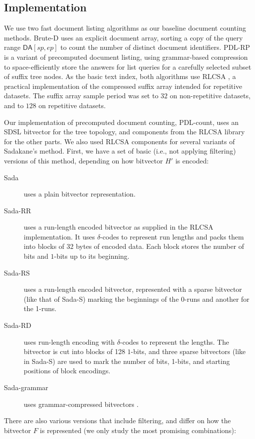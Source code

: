 \documentclass[11pt]{llncs}
\newcommand{\DA}{\ensuremath{\mathsf{DA}}}
\newcommand{\doclist}{\textsf{list}}
\newcommand{\BruteD}{\textsf{Brute-D}}
\newcommand{\PDLRP}{\textsf{PDL-RP}}
\newcommand{\PDLcount}{\textsf{PDL-count}} \newcommand{\SadaR}{\textsf{Sada-RR}} \newcommand{\SadaPG}{\textsf{Sada-P-G}} \newcommand{\SadaPR}{\textsf{Sada-P-RR}} \newcommand{\SadaRG}{\textsf{Sada-RR-G}} \newcommand{\SadaRR}{\textsf{Sada-RR-RR}} \newcommand{\SadaG}{\textsf{Sada-grammar}} \newcommand{\sada}{\textsf{Sada}} \newcommand{\sadaR}{\textsf{Sada-RS}} \newcommand{\sadaRS}{\textsf{Sada-RS-S}} \newcommand{\sadaD}{\textsf{Sada-RD}} \newcommand{\sadaDS}{\textsf{Sada-RD-S}} \newcommand{\sadaS}{\textsf{Sada-S-S}} \newcommand{\sadaSS}{\textsf{Sada-S}} \newcommand{\wt}{\textsf{ILCP}}
\newcommand{\onebit}{$1$\nobreakdash-bit}
\begin{document}
\subsection{Implementation}

We use two fast document listing algorithms as our baseline document counting methods. \BruteD{} uses an explicit document array, sorting a copy of the query range $\DA[sp,ep]$ to count the number of distinct document identifiers. \PDLRP{} \cite{NPS2014} is a variant of precomputed document listing, using grammar-based compression to space-efficiently store the answers for \doclist{} queries for a carefully selected subset of suffix tree nodes. As the basic text index, both algorithms use RLCSA \cite{Maekinen2010}, a practical implementation of the compressed suffix array intended for repetitive datasets. The suffix array sample period was set to $32$ on non-repetitive datasets, and to $128$ on repetitive datasets.

Our implementation of precomputed document counting, \PDLcount, uses an SDSL
\cite{Gog2014b} bitvector for the tree topology, and components from the RLCSA
library for the other parts. We also used RLCSA components for several
variants of Sadakane's method. First, we have a set of basic (i.e., not
applying filtering) versions of this method, depending on how bitvector $H'$
is encoded:
\begin{description}
\item[\sada] uses a plain bitvector representation.
\item[\SadaR] uses a run-length encoded bitvector as supplied in the RLCSA
implementation. It uses $\delta$-codes to represent run lengths and packs
them into blocks of 32 bytes of encoded data. Each block stores the number
of bits and \onebit{}s up to its beginning.
\item[\sadaR] uses a run-length encoded bitvector, represented with a sparse
bitvector (like that of \sadaSS) marking the beginnings of the 0-runs and
another for the 1-runs.
\item[\sadaD] uses run-length encoding with $\delta$-codes to represent the
lengths. The bitvector is cut into blocks of 128 \onebit{}s, and three sparse
bitvectors (like in \sadaSS) are used to mark the number of bits, 1-bits, and
starting positions of block encodings. 
\item[\SadaG{}] uses grammar-compressed bitvectors \cite{NO14}.
\end{description}

There are also various versions that include filtering, and differ on how
the bitvector $F$ is represented (we only study the most promising
combinations):
\end{document}
